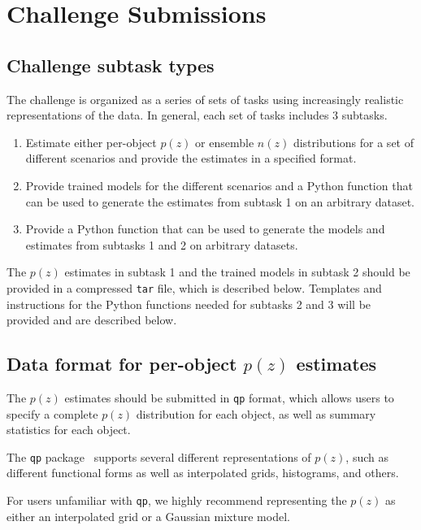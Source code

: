 \documentclass[11pt,twoside,letterpaper,onecolumn,english]{article}
\begin{document}
\section{Challenge Submissions}
\label{sec:challenge_submissions}

\subsection{Challenge subtask types}

The challenge is organized as a series of sets of tasks using
increasingly realistic representations of the data. In general, each
set of tasks includes 3 subtasks.

\begin{enumerate}
  \item{Estimate either per-object $p(z)$ or ensemble $n(z)$
      distributions for a set of different scenarios and provide the
      estimates in a specified format.}
  \item{Provide trained models for the different scenarios and a
      Python function that can be used to generate the estimates from subtask
      1 on an arbitrary dataset.}    
  \item{Provide a Python function that can be used to
      generate the models and estimates from subtasks 1 and 2 on
      arbitrary datasets.}
\end{enumerate}

The $p(z)$ estimates in subtask 1 and the trained models in subtask 2 should be provided
in a compressed \texttt{tar} file, which is described below.   Templates and instructions for the
Python functions needed for subtasks 2 and 3 will be provided and are
described below.


\subsection{\texorpdfstring{Data format for per-object $p(z)$ estimates}{Data format for per-object p(z) estimates}}

The $p(z)$ estimates should be submitted in \texttt{qp} format,
which allows users to specify a complete $p(z)$ distribution for
each object, as well as summary statistics for each object.

The \texttt{qp} package~\cite{QP} supports several different representations of
$p(z)$, such as different functional forms as well as interpolated
grids, histograms, and others.

For users unfamiliar with \texttt{qp}, we highly recommend representing
the $p(z)$ as either an interpolated grid or a Gaussian mixture model.
\end{document}
